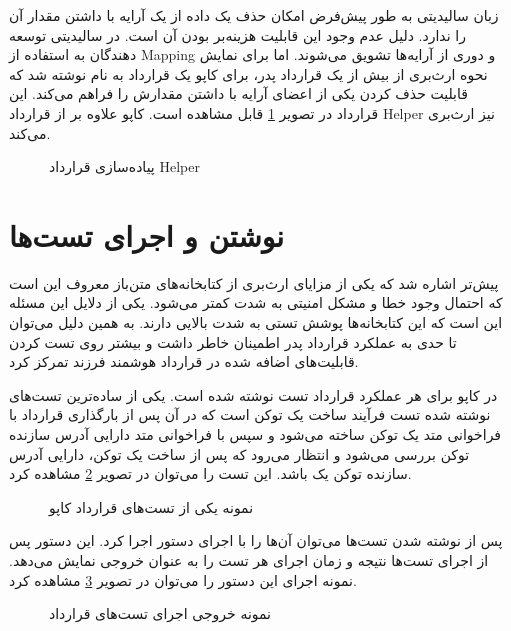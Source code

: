 زبان سالیدیتی به طور پیش‌فرض امکان حذف یک داده از یک آرایه با داشتن مقدار آن را ندارد.
دلیل عدم وجود این قابلیت هزینه‌بر بودن آن است.
در سالیدیتی توسعه دهندگان به استفاده از
\gls{Mapping}
و دوری از آرایه‌ها تشویق می‌شوند.
اما برای نمایش نحوه ارث‌بری از بیش از یک قرارداد پدر، برای کاپو یک قرارداد به نام
نوشته شد که قابلیت حذف کردن یکی از اعضای آرایه با داشتن مقدارش را فراهم می‌کند.
این قرارداد در تصویر
\ref{fig:Helper}
قابل مشاهده است. کاپو علاوه بر
از قرارداد Helper نیز ارث‌بری می‌کند.

\begin{figure}
\centerline{}
\caption{پیاده‌سازی قرارداد Helper}
\label{fig:Helper}
\end{figure}

\section{نوشتن و اجرای تست‌ها}
پیش‌تر اشاره شد که یکی از مزایای ارث‌بری از کتابخانه‌های متن‌باز معروف
این است که احتمال وجود خطا و مشکل امنیتی به شدت کمتر می‌شود.
یکی از دلایل این مسئله این است که این کتابخانه‌ها پوشش تستی به شدت بالایی دارند.
به همین دلیل می‌توان تا حدی به عملکرد قرارداد پدر اطمینان خاطر داشت
و بیشتر روی تست کردن قابلیت‌های اضافه شده در قرارداد هوشمند فرزند تمرکز کرد.

در کاپو برای هر عملکرد قرارداد تست نوشته شده است.
یکی از ساده‌ترین تست‌های نوشته شده تست فرآیند ساخت یک توکن است که در آن پس از بارگذاری قرارداد با فراخوانی متد
یک توکن ساخته می‌شود و سپس با فراخوانی متد
دارایی آدرس سازنده توکن بررسی می‌شود و انتظار می‌رود که پس از ساخت یک توکن، دارایی آدرس سازنده توکن یک باشد.
این تست را می‌توان در تصویر
\ref{fig:mint-test}
مشاهده کرد.

\begin{figure}
\centerline{}
\caption{نمونه یکی از تست‌های قرارداد کاپو}
\label{fig:mint-test}
\end{figure}

پس از نوشته شدن تست‌ها می‌توان آن‌ها را با اجرای دستور
اجرا کرد.
این دستور پس از اجرای تست‌ها نتیجه و زمان اجرای هر تست را به عنوان خروجی نمایش می‌دهد.
نمونه اجرای این دستور را می‌توان در تصویر
\ref{fig:test-output}
مشاهده کرد.

\begin{figure}
\centerline{}
\caption{نمونه خروجی اجرای تست‌های قرارداد}
\label{fig:test-output}
\end{figure}

